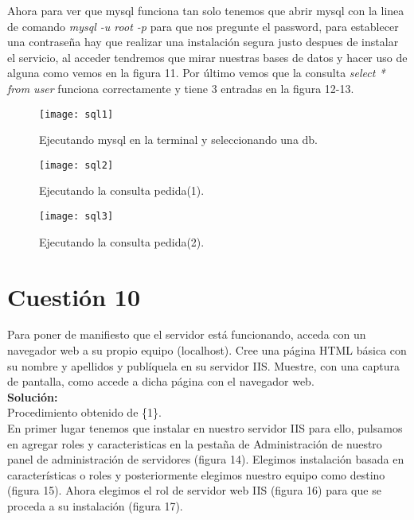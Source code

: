 \documentclass[a4paper, 11pt]{article} %
\begin{document}
\pagebreak
Ahora para ver que mysql funciona tan solo tenemos que abrir mysql con la linea de comando \textit{mysql -u root -p} para que nos pregunte el password, para establecer una contraseña hay que realizar una instalación segura justo despues de instalar el servicio, al acceder tendremos que mirar nuestras bases de datos y hacer uso de alguna como vemos en la figura 11.
Por último vemos que la consulta \textit{select * from user} funciona correctamente y tiene 3 entradas en la figura 12-13.
\begin{figure}[h]
\centering 
\texttt{[image: sql1]} 
\caption{Ejecutando mysql en la terminal y seleccionando una db.} 
\vspace{-0.5cm}
\label{contexto:figura} 
\end{figure}
\begin{figure}[h]
\centering 
\texttt{[image: sql2]} 
\caption{Ejecutando la consulta pedida(1).} 
\vspace{-0.5cm}
\label{contexto:figura} 
\end{figure}
\begin{figure}[h]
\centering 
\texttt{[image: sql3]} 
\caption{Ejecutando la consulta pedida(2).} 
\vspace{-0.5cm}
\label{contexto:figura} 
\end{figure}
\section{Cuestión 10}
Para poner de manifiesto que el servidor está funcionando, acceda con un navegador web a su propio equipo (localhost). Cree una página HTML básica con su nombre y apellidos y publíquela en su servidor IIS. Muestre, con una captura de pantalla, como accede a dicha página con el navegador web.\\
\textbf{Solución:}\\

Procedimiento obtenido de \{1\}.\\

En primer lugar tenemos que instalar en nuestro servidor IIS para ello, pulsamos en agregar roles y caracteristicas en la pestaña de Administración de nuestro panel de administración de servidores (figura 14). Elegimos instalación basada en características o roles y posteriormente elegimos nuestro equipo como destino (figura 15). Ahora elegimos el rol de servidor web IIS (figura 16) para que se proceda a su instalación (figura 17).\\
\end{document}
